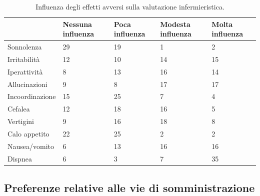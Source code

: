 \bgroup
\def\arraystretch{1.5}
\begin{table}[!h]
    \centering
    \begin{tabular}{p{} p{} p{} p{} p{}}
  & \footnotesize{Nessuna influenza} & \footnotesize{Poca influenza} & \footnotesize{Modesta influenza} & \footnotesize{Molta influenza}\\ \hline
    \footnotesize{Sonnolenza} & \footnotesize29 & \footnotesize19 & \footnotesize1 & \footnotesize2\\ \hline
    \footnotesize{Irritabilità} & \footnotesize12 & \footnotesize10 & \footnotesize14 & \footnotesize15\\ \hline
    \footnotesize{Iperattività} & \footnotesize8 & \footnotesize13 & \footnotesize16 & \footnotesize14\\ \hline
    \footnotesize{Allucinazioni} & \footnotesize9 & \footnotesize8 & \footnotesize17 & \footnotesize17\\ \hline
    \footnotesize{Incoordinazione} & \footnotesize15 & \footnotesize25 & \footnotesize7 & \footnotesize4\\ \hline
    \footnotesize{Cefalea} & \footnotesize12 & \footnotesize18 & \footnotesize16 & \footnotesize5\\ \hline
    \footnotesize{Vertigini}  & \footnotesize9 & \footnotesize16 & \footnotesize18 & \footnotesize8\\ \hline
    \footnotesize{Calo appetito} & \footnotesize22 & \footnotesize25 & \footnotesize2 & \footnotesize2\\ \hline
    \footnotesize{Nausea/vomito} & \footnotesize6 & \footnotesize13 & \footnotesize16 & \footnotesize16\\ \hline
    \footnotesize{Dispnea} & \footnotesize6 & \footnotesize3 & \footnotesize7 & \footnotesize35\\ \hline

    \end{tabular}
    \caption{Influenza degli effetti avversi sulla valutazione infermieristica.}
    \label{tab:effavv2}
\end{table}
\egroup



\subsection*{Preferenze relative alle vie di somministrazione}

